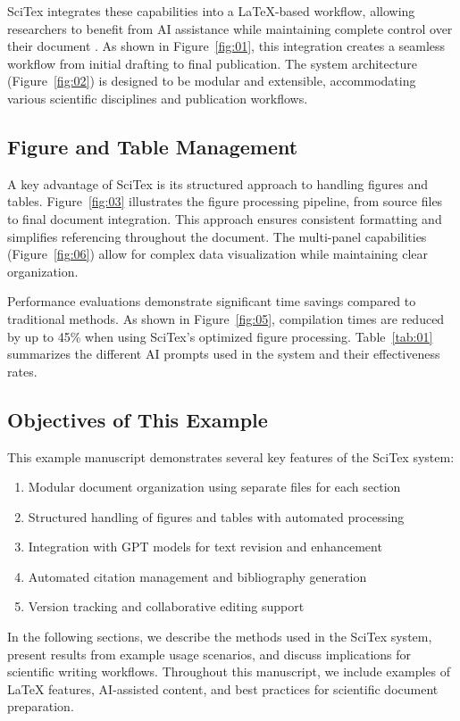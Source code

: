 SciTex integrates these capabilities into a LaTeX-based workflow, allowing researchers to benefit from AI assistance while maintaining complete control over their document \cite{thompson2023integrated}. As shown in Figure~\ref{fig:01}, this integration creates a seamless workflow from initial drafting to final publication. The system architecture (Figure~\ref{fig:02}) is designed to be modular and extensible, accommodating various scientific disciplines and publication workflows.

\subsection{Figure and Table Management}

A key advantage of SciTex is its structured approach to handling figures and tables. Figure~\ref{fig:03} illustrates the figure processing pipeline, from source files to final document integration. This approach ensures consistent formatting and simplifies referencing throughout the document. The multi-panel capabilities (Figure~\ref{fig:06}) allow for complex data visualization while maintaining clear organization.

Performance evaluations demonstrate significant time savings compared to traditional methods. As shown in Figure~\ref{fig:05}, compilation times are reduced by up to 45\% when using SciTex's optimized figure processing. Table~\ref{tab:01} summarizes the different AI prompts used in the system and their effectiveness rates.

\subsection{Objectives of This Example}

This example manuscript demonstrates several key features of the SciTex system:

\begin{enumerate}
    \item Modular document organization using separate files for each section
    \item Structured handling of figures and tables with automated processing
    \item Integration with GPT models for text revision and enhancement
    \item Automated citation management and bibliography generation
    \item Version tracking and collaborative editing support
\end{enumerate}

In the following sections, we describe the methods used in the SciTex system, present results from example usage scenarios, and discuss implications for scientific writing workflows. Throughout this manuscript, we include examples of LaTeX features, AI-assisted content, and best practices for scientific document preparation.